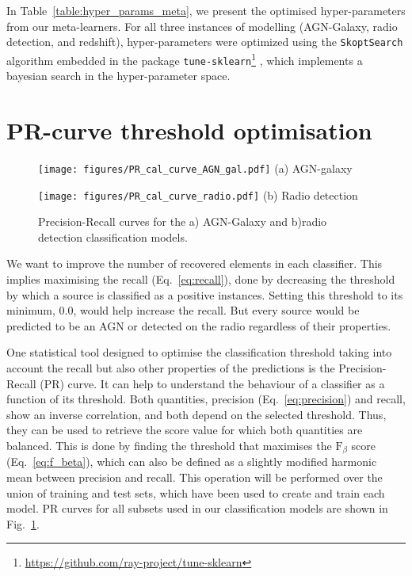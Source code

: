\documentclass{aa}
\begin{document}
\begin{appendix}
In Table~\ref{table:hyper_params_meta}, we present the optimised hyper-parameters from our meta-learners. For all three instances of modelling (AGN-Galaxy, radio detection, and redshift), hyper-parameters were optimized using the \verb|SkoptSearch| algorithm embedded in the package \verb|tune-sklearn|\footnote{\url{https://github.com/ray-project/tune-sklearn}} \citep[\texttt{v0.4.1};][]{head_tim_2021_5565057}, which implements a bayesian search in the hyper-parameter space.

\section{PR-curve threshold optimisation}\label{sec:app_pr_curve}

\begin{figure}
  \centering
  \begin{minipage}{0.24\textwidth}
    \centering
    \texttt{[image: figures/PR\_cal\_curve\_AGN\_gal.pdf]}\hfill\break
    {(a) AGN-galaxy} 
  \end{minipage}
  \hfill 
  \begin{minipage}{0.24\textwidth}
    \centering
    \texttt{[image: figures/PR\_cal\_curve\_radio.pdf]}\hfill\break
    {(b) Radio detection}
  \end{minipage}
  \centering
  \caption{Precision-Recall curves for the a) AGN-Galaxy and b)radio detection classification models.}
  \label{fig:PR_curves_classification}
\end{figure}

We want to improve the number of recovered elements in each classifier. This implies maximising the recall (Eq.~\ref{eq:recall}), done by decreasing the threshold by which a source is classified as a positive instances. Setting this threshold to its minimum, $0.0$, would help increase the recall. But every source would be predicted to be an AGN or detected on the radio regardless of their properties.%

One statistical tool designed to optimise the classification threshold taking into account the recall but also other properties of the predictions is the Precision-Recall (PR) curve. It can help to understand the behaviour of a classifier as a function of its threshold. Both quantities, precision (Eq.~\ref{eq:precision}) and recall, show an inverse correlation, and both depend on the selected threshold. Thus, they can be used to retrieve the score value for which both quantities are balanced. This is done by finding the threshold that maximises the $\mathrm{F}_{\beta}$ score (Eq.~\ref{eq:f_beta}), which can also be defined as a slightly modified harmonic mean between precision and recall. This operation will be performed over the union of training and test sets, which have been used to create and train each model. PR curves for all subsets used in our classification models are shown in Fig.~\ref{fig:PR_curves_classification}.


\end{appendix}
\end{document}

